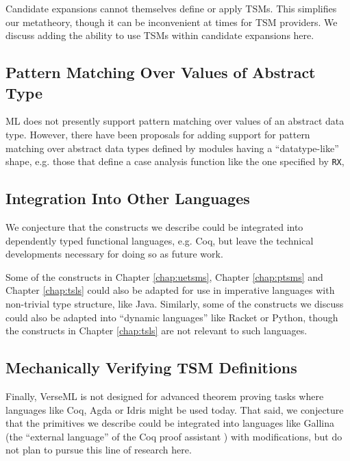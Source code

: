 Candidate expansions cannot themselves define or apply TSMs. This simplifies our metatheory, though it can be inconvenient at times for TSM providers. We discuss adding the ability to use TSMs within candidate expansions here.

\subsection{Pattern Matching Over Values of Abstract Type}\label{sec:patterns-for-abstract-types}
ML does not presently support pattern matching over values of an abstract data type. However, there have been proposals for adding support for pattern matching over abstract data types defined by modules having a ``datatype-like'' shape, e.g. those that define a case analysis function like the one specified by \lstinline{RX}, %


\subsection{Integration Into Other Languages}\label{sec:integration}
We conjecture that the constructs we describe could be integrated into dependently typed functional languages, e.g. Coq, but leave the technical developments necessary for doing so as future work.

Some of the constructs in Chapter \ref{chap:uetsms}, Chapter \ref{chap:ptsms} and Chapter \ref{chap:tsls} could also be adapted for use in imperative languages with non-trivial type structure, like Java. Similarly, some of the constructs we discuss could also be adapted into ``{dynamic languages}'' like Racket or Python, though the constructs in Chapter \ref{chap:tsls} are not relevant to such languages. 


\subsection{Mechanically Verifying TSM Definitions}\label{sec:verifying-tsms}
Finally, VerseML is not designed for advanced theorem proving tasks where languages like Coq, Agda or Idris might be used today. That said, we conjecture that the primitives we describe could be integrated into languages like Gallina (the ``external language'' of the Coq proof assistant  \cite{Coq:manual}) with  modifications, but do not plan to pursue this line of research here.

